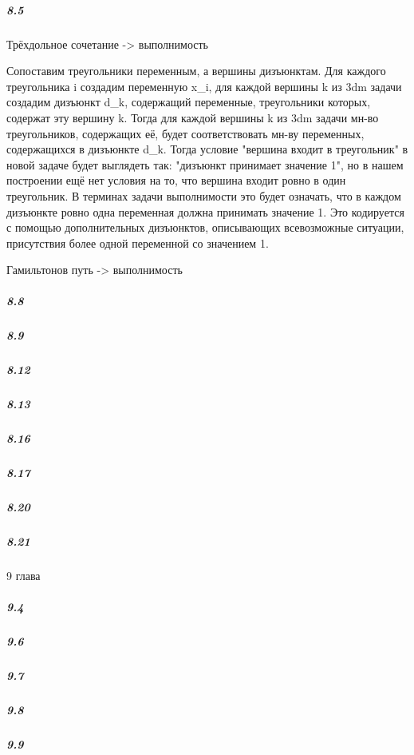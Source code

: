 \documentclass{article}
\begin{document}
\subparagraph{8.5}

Трёхдольное сочетание -> выполнимость

Сопоставим треугольники переменным, а вершины дизъюнктам. Для каждого треугольника i создадим переменную x_i, для каждой вершины k из 3dm задачи создадим дизъюнкт d_k, содержащий переменные, треугольники которых, содержат эту вершину k. Тогда для каждой вершины k из 3dm задачи мн-во треугольников, содержащих её, будет соответствовать мн-ву переменных, содержащихся в дизъюнкте d_k. Тогда условие "вершина входит в треугольник" в новой задаче будет выглядеть так: "дизъюнкт принимает значение 1", но в нашем построении ещё нет условия на то, что вершина входит ровно в один треугольник. В терминах задачи выполнимости это будет означать, что в каждом дизъюнкте ровно одна переменная должна принимать значение 1. Это кодируется с помощью дополнительных дизъюнктов, описывающих всевозможные ситуации, присутствия более одной переменной со значением 1.

Гамильтонов путь -> выполнимость





\subparagraph{8.8}

\subparagraph{8.9}

\subparagraph{8.12}

\subparagraph{8.13}

\subparagraph{8.16}

\subparagraph{8.17}

\subparagraph{8.20}

\subparagraph{8.21}

9 глава

\subparagraph{9.4}

\subparagraph{9.6}

\subparagraph{9.7}

\subparagraph{9.8}

\subparagraph{9.9}
\end{document}
